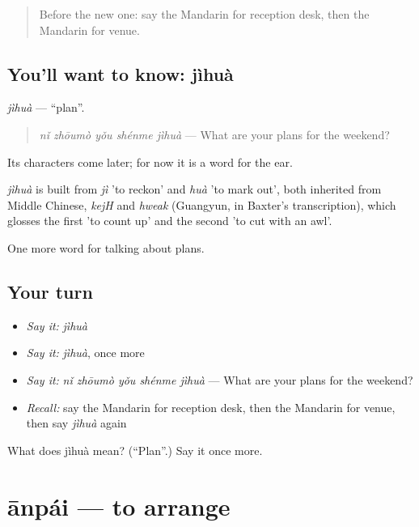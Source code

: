 \begin{quote}
Before the new one: say the Mandarin for reception desk, then the Mandarin for venue.
\end{quote}

\subsection*{You'll want to know: jìhuà}
\emph{jìhuà} — \textquotedblleft{}plan\textquotedblright{}.

\begin{quote}
\emph{nǐ zhōumò yǒu shénme jìhuà} — What are your plans for the weekend?
\end{quote}

Its characters come later; for now it is a word for the ear.

\begin{cousinweb}
\emph{jìhuà} is built from \emph{jì} 'to reckon' and \emph{huà} 'to mark out', both inherited from Middle Chinese, \emph{kejH} and \emph{hweak} (Guangyun, in Baxter's transcription), which glosses the first 'to count up' and the second 'to cut with an awl'.
\end{cousinweb}

\begin{grammarlens}[title={What you've built}]
One more word for talking about plans.
\end{grammarlens}

\subsection*{Your turn}
\begin{itemize}
\raggedright
  \item \emph{Say it:} \emph{jìhuà}
  \item \emph{Say it:} \emph{jìhuà}, once more
  \item \emph{Say it:} \emph{nǐ zhōumò yǒu shénme jìhuà} — What are your plans for the weekend?
  \item \emph{Recall:} say the Mandarin for reception desk, then the Mandarin for venue, then say \emph{jìhuà} again
\end{itemize}

\begin{tcolorbox}[breakable,colback=teal!4,colframe=teal!35!black,title={Before you move on}]
What does jìhuà mean? (\textquotedblleft{}Plan\textquotedblright{}.) Say it once more.
\end{tcolorbox}
\section[ānpái]{ānpái — to arrange}

